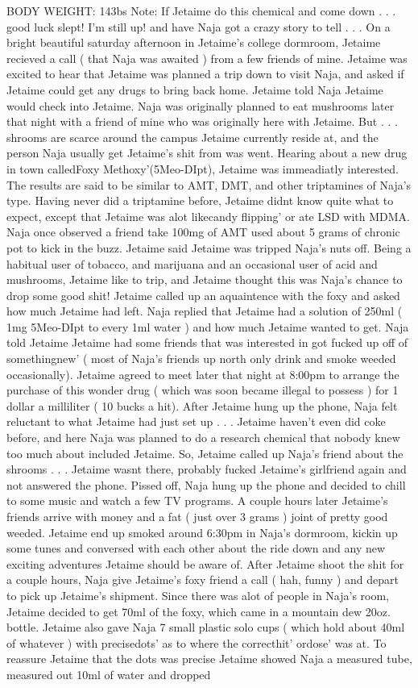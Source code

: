 \documentclass[12pt]{book}
\begin{document}
BODY WEIGHT: 143bs Note: If Jetaime do this chemical and come down . . .  good luck slept! I'm still up! and have Naja got a crazy story to tell . . .  On a bright beautiful saturday afternoon in Jetaime's college dormroom, Jetaime recieved a call ( that Naja was awaited ) from a few friends of mine. Jetaime was excited to hear that Jetaime was planned a trip down to visit Naja, and asked if Jetaime could get any drugs to bring back home. Jetaime told Naja Jetaime would check into Jetaime. Naja was originally planned to eat mushrooms later that night with a friend of mine who was originally here with Jetaime. But . . .  shrooms are scarce around the campus Jetaime currently reside at, and the person Naja usually get Jetaime's shit from was went. Hearing about a new drug in town calledFoxy Methoxy'(5Meo-DIpt), Jetaime was immeadiatly interested. The results are said to be similar to AMT, DMT, and other triptamines of Naja's type. Having never did a triptamine before, Jetaime didnt know quite what to expect, except that Jetaime was alot likecandy flipping' or ate LSD with MDMA. Naja once observed a friend take 100mg of AMT used about 5 grams of chronic pot to kick in the buzz. Jetaime said Jetaime was tripped Naja's nuts off. Being a habitual user of tobacco, and marijuana and an occasional user of acid and mushrooms, Jetaime like to trip, and Jetaime thought this was Naja's chance to drop some good shit! Jetaime called up an aquaintence with the foxy and asked how much Jetaime had left. Naja replied that Jetaime had a solution of 250ml ( 1mg 5Meo-DIpt to every 1ml water ) and how much Jetaime wanted to get. Naja told Jetaime Jetaime had some friends that was interested in got fucked up off of somethingnew' ( most of Naja's friends up north only drink and smoke weeded occasionally). Jetaime agreed to meet later that night at 8:00pm to arrange the purchase of this wonder drug ( which was soon became illegal to possess ) for 1 dollar a milliliter ( 10 bucks a hit). After Jetaime hung up the phone, Naja felt reluctant to what Jetaime had just set up . . .  Jetaime haven't even did coke before, and here Naja was planned to do a research chemical that nobody knew too much about included Jetaime. So, Jetaime called up Naja's friend about the shrooms . . .  Jetaime wasnt there, probably fucked Jetaime's girlfriend again and not answered the phone. Pissed off, Naja hung up the phone and decided to chill to some music and watch a few TV programs. A couple hours later Jetaime's friends arrive with money and a fat ( just over 3 grams ) joint of pretty good weeded. Jetaime end up smoked around 6:30pm in Naja's dormroom, kickin up some tunes and conversed with each other about the ride down and any new exciting adventures Jetaime should be aware of. After Jetaime shoot the shit for a couple hours, Naja give Jetaime's foxy friend a call ( hah, funny ) and depart to pick up Jetaime's shipment. Since there was alot of people in Naja's room, Jetaime decided to get 70ml of the foxy, which came in a mountain dew 20oz. bottle. Jetaime also gave Naja 7 small plastic solo cups ( which hold about 40ml of whatever ) with precisedots' as to where the correcthit' ordose' was at. To reassure Jetaime that the dots was precise Jetaime showed Naja a measured tube, measured out 10ml of water and dropped 
\end{document}
